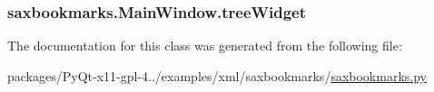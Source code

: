 \subsubsection[{tree\+Widget}]{\setlength{\rightskip}{0pt plus 5cm}saxbookmarks.\+Main\+Window.\+tree\+Widget}\label{classsaxbookmarks_1_1MainWindow_a683509d4491c6aeab36e271157881834}


The documentation for this class was generated from the following file\+:\begin{DoxyCompactItemize}
\item 
packages/\+Py\+Qt-\/x11-\/gpl-\/4../examples/xml/saxbookmarks/\hyperlink{saxbookmarks_8py}{saxbookmarks.\+py}\end{DoxyCompactItemize}
